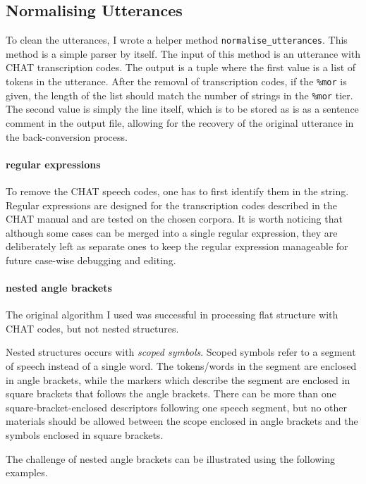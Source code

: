 \subsection{Normalising Utterances}

To clean the utterances, I wrote a helper method \texttt{normalise\_utterances}. This method is a simple parser by itself. The input of this method is an utterance with CHAT transcription codes. The output is a tuple where the first value is a list of tokens in the utterance. After the removal of transcription codes, if the \texttt{\%mor} is given, the length of the list should match the number of strings in the \texttt{\%mor} tier. The second value is simply the line itself, which is to be stored as is as a sentence comment  in the output file, allowing for the recovery of the original utterance in the back-conversion process.

\paragraph{regular expressions} To remove the CHAT speech codes, one has to first identify them in the string. Regular expressions are designed for the transcription codes described in the CHAT manual and are tested on the chosen corpora. It is worth noticing that although some cases can be merged into a single regular expression, they are deliberately left as separate ones to keep the regular expression manageable for future case-wise debugging and editing.

\paragraph{nested angle brackets} The original algorithm I used was successful in processing flat structure with CHAT codes, but not nested structures.

Nested structures occurs with \emph{scoped symbols}. Scoped symbols refer to a segment of speech instead of a single word. The tokens/words in the segment are enclosed in angle brackets, while the markers which describe the segment are enclosed in square brackets that follows the angle brackets. There can be more than one square-bracket-enclosed descriptors following one speech segment, but no other materials should be allowed between the scope enclosed in angle brackets and the symbols enclosed in square brackets.

The challenge of nested angle brackets can be illustrated using the following examples.

